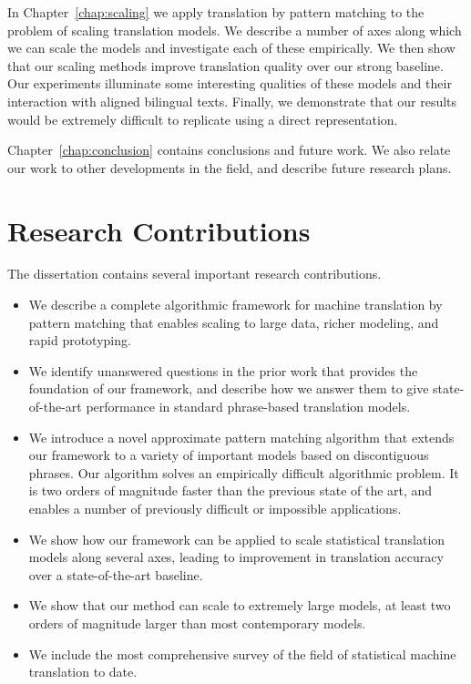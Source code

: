 In Chapter~\ref{chap:scaling} we apply translation by pattern matching to the problem of scaling
translation models.  We describe a number of axes along which
we can scale the models and investigate each of these empirically.  We then show
that our scaling methods improve translation quality over our strong
baseline.  Our experiments illuminate some interesting qualities
of these models and their interaction with aligned bilingual texts.  Finally,
we demonstrate that our results would be extremely difficult to replicate
using a direct representation.

Chapter~\ref{chap:conclusion} contains conclusions and future work.  We also
relate our work to other developments in the field, and describe
future research plans.

\section{Research Contributions}

The dissertation contains several important research contributions.

\begin{itemize}

	\item We describe a complete algorithmic framework for machine translation
	by pattern matching that enables scaling to large data, richer modeling,
	and rapid prototyping.

	\item We identify unanswered questions in the prior work that provides the foundation
	of our framework, and describe how we answer them to give
	state-of-the-art performance in standard phrase-based translation models.

	\item We introduce a novel approximate pattern matching algorithm that
	extends our framework to a variety of important models based on 
	discontiguous phrases.  Our algorithm solves an empirically difficult algorithmic problem.  
	It is two orders of magnitude faster than the previous state of the art, and 
	enables a number of previously difficult or impossible applications.

	\item We show how our framework can be applied to scale statistical translation
	models along several axes, leading to improvement in translation accuracy over
	a state-of-the-art baseline.

	\item We show that our method can scale to extremely large models, at least
	two orders of magnitude larger than most contemporary models.

	\item We include the most comprehensive survey of the field of statistical
	machine translation to date.
\end{itemize}







